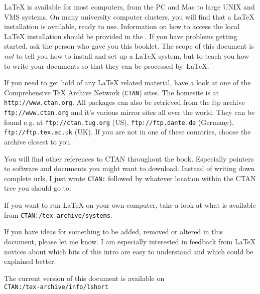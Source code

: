 \bigskip
\LaTeX{} is available for most computers, from the PC and Mac to large
UNIX and VMS systems. On many university computer clusters, you will
find that a \LaTeX{} installation is available, ready to use.
Information on how to access
the local \LaTeX{} installation should be provided in the \guide. If
you have problems getting started, ask the person who gave you this
booklet. The scope of this document is \emph{not} to tell you how to
install and set up a \LaTeX{} system, but to teach you how to write
your documents so that they can be processed by~\LaTeX{}.

\bigskip
\noindent If you need to get hold of any \LaTeX{} related material, 
have a look at one of the Comprehensive \TeX{} Archive Network
(\texttt{CTAN}) sites. The homesite is at
\texttt{http://www.ctan.org}. All packages can also be retrieved from
the ftp archive \texttt{ftp://www.ctan.org} and it's various mirror
sites all over the world.  They can be found e.g.{} at
\texttt{ftp://ctan.tug.org} (US), \texttt{ftp://ftp.dante.de}
(Germany), \texttt{ftp://ftp.tex.ac.uk} (UK).  If you are not in one
of these countries, choose the archive closest to you.

You will find other references to CTAN throughout the book. Especially
pointers to software and documents you might want to download. Instead
of writing down complete urls, I just wrote \texttt{CTAN:} followed by
whatever location within the CTAN tree you should go to. 

If you want to run \LaTeX{} on your own computer, take a look at what
is available from \texttt{CTAN:/tex-archive/systems}.

\noindent If you have ideas for something to be
added, removed or altered in this document, please let me know. I am
especially interested in feedback from \LaTeX{} novices about which
bits of this intro are easy to understand and which could be explained
better.

\bigskip
\begin{verse}
%
\end{verse}
\noindent The current version of this document is available on\\
\texttt{CTAN:/tex-archive/info/lshort}

\endinput



